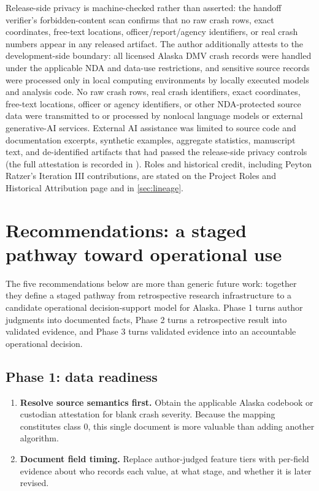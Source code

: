 \documentclass[11pt,letterpaper]{article}
\newcommand{\artifact}[1]{\begingroup\urlstyle{tt}\path{#1}\endgroup}
\begin{document}
Release-side privacy is machine-checked rather than asserted: the handoff verifier's forbidden-content scan confirms that no raw crash rows, exact coordinates, free-text locations, officer/report/agency identifiers, or real crash numbers appear in any released artifact. The author additionally attests to the development-side boundary: all licensed Alaska DMV crash records were handled under the applicable NDA and data-use restrictions, and sensitive source records were processed only in local computing environments by locally executed models and analysis code. No raw crash rows, real crash identifiers, exact coordinates, free-text locations, officer or agency identifiers, or other NDA-protected source data were transmitted to or processed by nonlocal language models or external generative-AI services. External AI assistance was limited to source code and documentation excerpts, synthetic examples, aggregate statistics, manuscript text, and de-identified artifacts that had passed the release-side privacy controls (the full attestation is recorded in \artifact{paper/AI_USE_AND_PRIVACY.md}). Roles and historical credit, including Peyton Ratzer's Iteration III contributions, are stated on the Project Roles and Historical Attribution page and in \cref{sec:lineage}.

\clearpage
\section{Recommendations: a staged pathway toward operational use}
\label{sec:roadmap}
The five recommendations below are more than generic future work: together they define a staged pathway from retrospective research infrastructure to a candidate operational decision-support model for Alaska. Phase 1 turns author judgments into documented facts, Phase 2 turns a retrospective result into validated evidence, and Phase 3 turns validated evidence into an accountable operational decision.

\subsection*{Phase 1: data readiness}
\begin{enumerate}[series=roadmap]
  \item \textbf{Resolve source semantics first.} Obtain the applicable Alaska codebook or custodian attestation for blank crash severity. Because the mapping constitutes class 0, this single document is more valuable than adding another algorithm.
  \item \textbf{Document field timing.} Replace author-judged feature tiers with per-field evidence about who records each value, at what stage, and whether it is later revised.
\end{enumerate}
\end{document}
